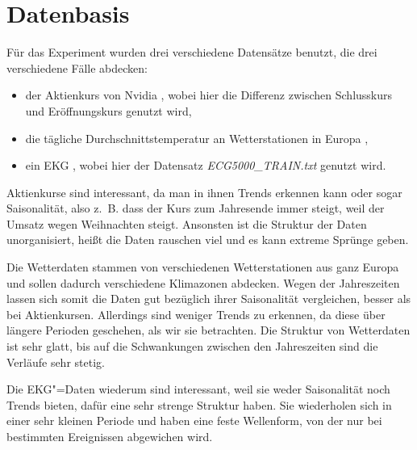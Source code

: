 \section{Datenbasis}
Für das Experiment wurden drei verschiedene Datensätze benutzt, die drei verschiedene Fälle abdecken: 
\begin{itemize}
    \item der Aktienkurs von Nvidia \cite{nvidiaStock}, wobei hier die Differenz zwischen Schlusskurs und Eröffnungskurs genutzt wird,
    \item die tägliche Durchschnittstemperatur an Wetterstationen in Europa \cite{ecadWetterdaten},
    \item ein EKG \cite{ecg500}, wobei hier der Datensatz \textit{ECG5000\_TRAIN.txt} genutzt wird.
\end{itemize}

Aktienkurse sind interessant, da man in ihnen Trends erkennen kann oder sogar Saisonalität, also z.~B. dass der Kurs zum Jahresende immer steigt, weil der Umsatz wegen Weihnachten steigt. Ansonsten ist die Struktur der Daten unorganisiert, heißt die Daten rauschen viel und es kann extreme Sprünge geben.

Die Wetterdaten stammen von verschiedenen Wetterstationen aus ganz Europa und sollen dadurch verschiedene Klimazonen abdecken. Wegen der Jahreszeiten lassen sich somit die Daten gut bezüglich ihrer Saisonalität vergleichen, besser als bei Aktienkursen. Allerdings sind weniger Trends zu erkennen, da diese über längere Perioden geschehen, als wir sie betrachten. Die Struktur von Wetterdaten ist sehr glatt, bis auf die Schwankungen zwischen den Jahreszeiten sind die Verläufe sehr stetig.

Die EKG"=Daten wiederum sind interessant, weil sie weder Saisonalität noch Trends bieten, dafür eine sehr strenge Struktur haben. Sie wiederholen sich in einer sehr kleinen Periode und haben eine feste Wellenform, von der nur bei bestimmten Ereignissen abgewichen wird.